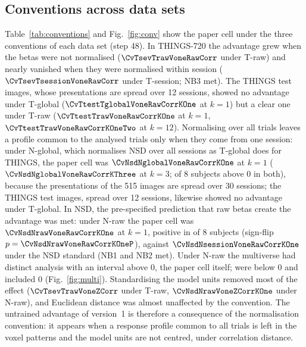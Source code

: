 \subsection{Conventions across data sets}
\label{sec:conventions}


Table~\ref{tab:conventions} and Fig.~\ref{fig:conv} show the paper cell under the three conventions of
each data set (step 48). In THINGS-720 the advantage grew when the betas were not normalised
($\CvTsevTrawVoneRawCorr$ under T-raw) and nearly vanished when they were normalised within session
($\CvTsevTsessionVoneRawCorr$ under T-session; NB3 met). The THINGS test images, whose presentations are
spread over 12 sessions, showed no advantage under T-global ($\CvTtestTglobalVoneRawCorrKOne$ at $k = 1$)
but a clear one under T-raw ($\CvTtestTrawVoneRawCorrKOne$ at $k = 1$, $\CvTtestTrawVoneRawCorrKOneTwo$ at
$k = 12$). Normalising over all trials leaves a profile common to the analysed trials only when they come
from one session: under N-global, which normalises NSD over all sessions as T-global does for THINGS, the
paper cell was $\CvNsdNglobalVoneRawCorrKOne$ at $k = 1$ ($\CvNsdNglobalVoneRawCorrKThree$ at $k = 3$;
\CvNsdNglobalVoneRawCorrKOnePos{} of 8 subjects above 0 in both),
because the presentations of the 515 images are spread over 30 sessions; the THINGS test images, spread
over 12 sessions, likewise showed no advantage under T-global. In NSD, the pre-specified prediction that raw betas create the advantage was met: under N-raw
the paper cell was $\CvNsdNrawVoneRawCorrKOne$ at $k = 1$, positive in \CvNsdNrawVoneRawCorrKOnePos{} of
8 subjects (sign-flip $p = \CvNsdNrawVoneRawCorrKOneP$), against $\CvNsdNsessionVoneRawCorrKOne$ under the
NSD standard (NB1 and NB2 met). Under N-raw the multiverse had \MvNrawAbove{} distinct analysis with an
interval above 0, the paper cell itself; \MvNrawBelow{} were below 0 and \MvNrawIncl{} included 0
(Fig.~\ref{fig:multi}). Standardising the model units removed most of the effect
($\CvTsevTrawVoneZCorr$ under T-raw, $\CvNsdNrawVoneZCorrKOne$ under N-raw), and Euclidean distance was
almost unaffected by the convention. The untrained advantage of version~1 is therefore a consequence of
the normalisation convention: it appears when a response profile common to all trials is left in the
voxel patterns and the model units are not centred, under correlation distance.

